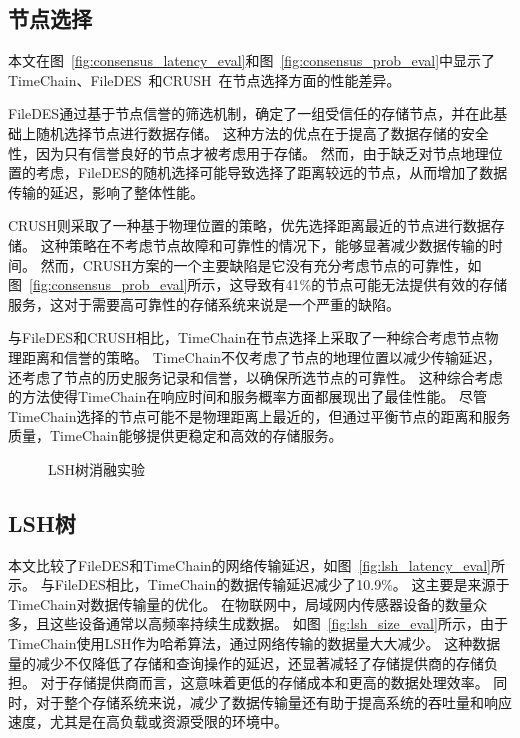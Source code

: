 \subsection{节点选择}
本文在图~\autoref{fig:consensus_latency_eval}和图~\autoref{fig:consensus_prob_eval}中显示了TimeChain、FileDES~\cite{xu2024filedes}和CRUSH~\cite{weil2006ceph}在节点选择方面的性能差异。

FileDES通过基于节点信誉的筛选机制，确定了一组受信任的存储节点，并在此基础上随机选择节点进行数据存储。
这种方法的优点在于提高了数据存储的安全性，因为只有信誉良好的节点才被考虑用于存储。
然而，由于缺乏对节点地理位置的考虑，FileDES的随机选择可能导致选择了距离较远的节点，从而增加了数据传输的延迟，影响了整体性能。

CRUSH则采取了一种基于物理位置的策略，优先选择距离最近的节点进行数据存储。
这种策略在不考虑节点故障和可靠性的情况下，能够显著减少数据传输的时间。
然而，CRUSH方案的一个主要缺陷是它没有充分考虑节点的可靠性，如图~\autoref{fig:consensus_prob_eval}所示，这导致有41\%的节点可能无法提供有效的存储服务，这对于需要高可靠性的存储系统来说是一个严重的缺陷。

与FileDES和CRUSH相比，TimeChain在节点选择上采取了一种综合考虑节点物理距离和信誉的策略。
TimeChain不仅考虑了节点的地理位置以减少传输延迟，还考虑了节点的历史服务记录和信誉，以确保所选节点的可靠性。
这种综合考虑的方法使得TimeChain在响应时间和服务概率方面都展现出了最佳性能。
尽管TimeChain选择的节点可能不是物理距离上最近的，但通过平衡节点的距离和服务质量，TimeChain能够提供更稳定和高效的存储服务。

\begin{figure*}[t]
    \centering
    \begin{minipage}{0.96\linewidth}
        \vspace{-0.5ex}
        \caption{LSH树消融实验} 
    \end{minipage}
\end{figure*}

\subsection{LSH树}
本文比较了FileDES和TimeChain的网络传输延迟，如图~\autoref{fig:lsh_latency_eval}所示。
与FileDES相比，TimeChain的数据传输延迟减少了10.9\%。
这主要是来源于TimeChain对数据传输量的优化。
在物联网中，局域网内传感器设备的数量众多，且这些设备通常以高频率持续生成数据。
如图~\autoref{fig:lsh_size_eval}所示，由于TimeChain使用LSH作为哈希算法，通过网络传输的数据量大大减少。
这种数据量的减少不仅降低了存储和查询操作的延迟，还显著减轻了存储提供商的存储负担。
对于存储提供商而言，这意味着更低的存储成本和更高的数据处理效率。
同时，对于整个存储系统来说，减少了数据传输量还有助于提高系统的吞吐量和响应速度，尤其是在高负载或资源受限的环境中。

